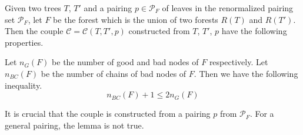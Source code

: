 \begin{lem}\label{eq.ineqn_BCn_G} Given two trees $T$, $T'$ and a pairing $p\in\mathcal{P}_F$ of leaves in the renormalized pairing set $\mathcal{P}_F$, let $F$ be the forest which is the union of two forests $R(T)$ and $R(T')$. Then the couple $\mathcal{C} = \mathcal{C}(T,T',p)$ constructed from $T$, $T'$, $p$ have the following properties.


Let $n_{G}(F)$ be the number of good and bad nodes of $F$ respectively. Let $n_{BC}(F)$ be the number of chains of bad nodes of $F$. Then we have the following inequality.
\begin{equation}\label{eq.n_Bn_G}
 n_{BC}(F) + 1 \le 2n_{G}(F)
\end{equation}
\end{lem}
\begin{rem}
It is crucial that the couple is constructed from a pairing $p$ from $\mathcal{P}_F$. For a general pairing, the lemma is not true.
\end{rem}
